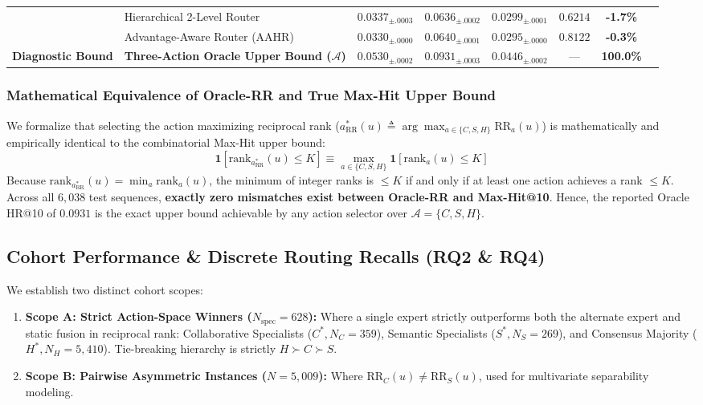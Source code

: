 \begin{table}[t]
\begin{tabular}{llcccccc}
& Hierarchical 2-Level Router & $0.0337_{\pm .0003}$ & $0.0636_{\pm .0002}$ & $\mathbf{0.0299}_{\pm .0001}$ & $0.6214$ & \textbf{-1.7\%} \\
& Advantage-Aware Router (AAHR) & $0.0330_{\pm .0000}$ & $0.0640_{\pm .0001}$ & $0.0295_{\pm .0000}$ & $0.8122$ & \textbf{-0.3\%} \\
\midrule
\textbf{Diagnostic Bound} 
& \textbf{Three-Action Oracle Upper Bound ($\mathcal{A}$)} & $\mathbf{0.0530}_{\pm .0002}$ & $\mathbf{0.0931}_{\pm .0003}$ & $\mathbf{0.0446}_{\pm .0002}$ & --- & \textbf{100.0\%} \\
\bottomrule
\end{tabular}
\end{table}

\subsubsection{Mathematical Equivalence of Oracle-RR and True Max-Hit Upper Bound}
We formalize that selecting the action maximizing reciprocal rank ($a^*_{\text{RR}}(u) \triangleq \arg\max_{a \in \{C, S, H\}} \text{RR}_a(u)$) is mathematically and empirically identical to the combinatorial Max-Hit upper bound:
\begin{equation}
    \mathbf{1}\left[\text{rank}_{a^*_{\text{RR}}}(u) \le K\right] \equiv \max_{a \in \{C, S, H\}} \mathbf{1}\left[\text{rank}_a(u) \le K\right]
\end{equation}
Because $\text{rank}_{a^*_{\text{RR}}}(u) = \min_{a} \text{rank}_a(u)$, the minimum of integer ranks is $\le K$ if and only if at least one action achieves a rank $\le K$. Across all $6{,}038$ test sequences, \textbf{exactly zero mismatches exist between Oracle-RR and Max-Hit@10}. Hence, the reported Oracle HR@10 of $0.0931$ is the exact upper bound achievable by any action selector over $\mathcal{A} = \{C, S, H\}$.

\subsection{Cohort Performance \& Discrete Routing Recalls (RQ2 \& RQ4)}
\label{sec:cohorts}

We establish two distinct cohort scopes:
\begin{enumerate}[leftmargin=*]
    \item \textbf{Scope A: Strict Action-Space Winners ($N_{\text{spec}} = 628$):} Where a single expert strictly outperforms both the alternate expert and static fusion in reciprocal rank: Collaborative Specialists ($C^*, N_C=359$), Semantic Specialists ($S^*, N_S=269$), and Consensus Majority ($H^*, N_H=5{,}410$). Tie-breaking hierarchy is strictly $H \succ C \succ S$.
    \item \textbf{Scope B: Pairwise Asymmetric Instances ($N = 5{,}009$):} Where $\text{RR}_C(u) \ne \text{RR}_S(u)$, used for multivariate separability modeling.
\end{enumerate}

